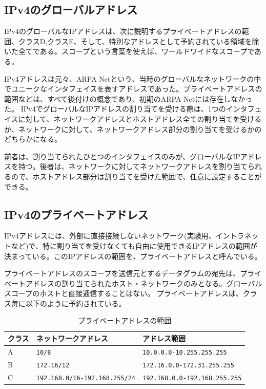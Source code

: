 \subsection{IPv4のグローバルアドレス}
IPv4のグローバルなIPアドレスは、次に説明するプライベートアドレスの範囲、クラスD,クラスE、そして、特別なアドレスとして予約されている領域を除いた全てである。スコープという言葉を使えば、ワールドワイドなスコープである。

IPv4アドレスは元々、ARPA Netという、当時のグローバルなネットワークの中でユニークなインタフェイスを表すアドレスであった。プライベートアドレスの範囲などは、すべて後付けの概念であり、初期のARPA Netには存在しなかった。
IPv4でグローバルなIPアドレスの割り当てを受ける際は、1つのインタフェイスに対して、ネットワークアドレスとホストアドレス全ての割り当てを受けるか、ネットワークに対して、ネットワークアドレス部分の割り当てを受けるかのどちらかになる。

前者は、割り当てられたひとつのインタフェイスのみが、グローバルなIPアドレスを持つ。後者は、ネットワークに対してネットワークアドレスを割り当てられるので、ホストアドレス部分は割り当てを受けた範囲で、任意に設定することができる。

\subsection{IPv4のプライベートアドレス}

IPv4アドレスには、外部に直接接続しないネットワーク(実験用、イントラネットなど)で、特に割り当てを受けなくても自由に使用できるIPアドレスの範囲が決まっている。このIPアドレスの範囲を、プライベートアドレスと呼んでいる。

プライベートアドレスのスコープを送信元とするデータグラムの宛先は、プライベートアドレスの割り当てられたホスト・ネットワークのみとなる。グローバルスコープのホストと直接通信することはない。
プライベートアドレスは、クラス毎に以下のように予約されている。

\begin{table}[hbtp] \caption{プライベートアドレスの範囲} \label{privateaddress}
\begin{center}
{\footnotesize
\begin{tabular}{lll} \toprule
クラス & ネットワークアドレス & アドレス範囲\\ \midrule
A & \verb+10/8+ & \verb+10.0.0.0-10.255.255.255+\\
B & \verb+172.16/12+ & \verb+172.16.0.0-172.31.255.255+\\
C & \verb+192.168.0/16-192.168.255/24+ & \verb+192.168.0.0-192.168.255.255+\\ \bottomrule
\end{tabular}
}
\end{center}
\end{table}


